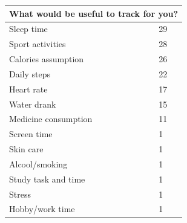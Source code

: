 \documentclass{article}
\begin{document}
\begin{table}[H]
	\centering
	\begin{tabularx}{0.9\textwidth}{X|p{1in}}
		\hline
		\multicolumn{2}{l}{\textbf{What would be useful to track for you?}} \\
		\hline
		Sleep time           & 29                                           \\
		\hline
		Sport activities     & 28                                           \\
		\hline
		Calories assumption  & 26                                           \\
		\hline
		Daily steps          & 22                                           \\
		\hline
		Heart rate           & 17                                           \\
		\hline
		Water drank          & 15                                           \\
		\hline
		Medicine consumption & 11                                           \\
		\hline
		Screen time          & 1                                            \\
		\hline
		Skin care            & 1                                            \\
		\hline
		Alcool/smoking       & 1                                            \\
		\hline
		Study task and time  & 1                                            \\
		\hline
		Stress               & 1                                            \\
		\hline
		Hobby/work time      & 1                                            \\
		\hline
	\end{tabularx}
\end{table}
\end{document}
